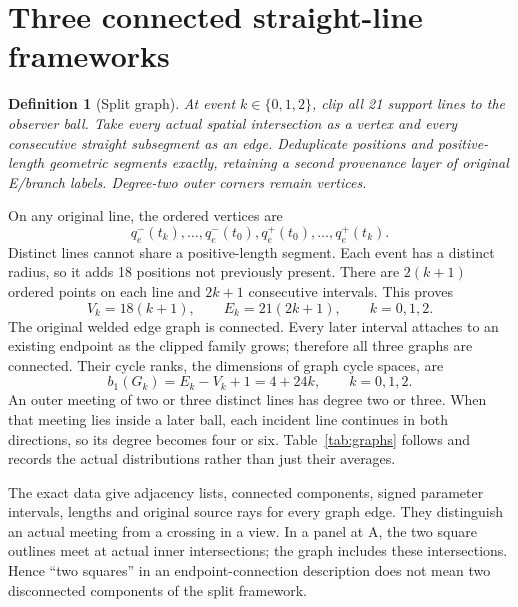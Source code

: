 \documentclass[11pt,a4paper]{article}
\newtheorem{definition}[theorem]{Definition}
\begin{document}
\section{Three connected straight-line frameworks}\label{sec:graphs}
\begin{definition}[Split graph]
At event $k\in\{0,1,2\}$, clip all 21 support lines to the observer ball. Take every actual spatial intersection as a vertex and every consecutive straight subsegment as an edge. Deduplicate positions and positive-length geometric segments exactly, retaining a second provenance layer of original E/branch labels. Degree-two outer corners remain vertices.
\end{definition}
On any original line, the ordered vertices are
\begin{equation}\label{eq:lineorder}
q_e^-(t_k),\ldots,q_e^-(t_0),q_e^+(t_0),\ldots,q_e^+(t_k).
\end{equation}
Distinct lines cannot share a positive-length segment. Each event has a distinct radius, so it adds 18 positions not previously present. There are $2(k+1)$ ordered points on each line and $2k+1$ consecutive intervals. This proves
\begin{equation}\label{eq:graphcounts}
V_k=18(k+1),\qquad E_k=21(2k+1),\qquad k=0,1,2.
\end{equation}
The original welded edge graph is connected. Every later interval attaches to an existing endpoint as the clipped family grows; therefore all three graphs are connected. Their cycle ranks, the dimensions of graph cycle spaces, are
\begin{equation}\label{eq:cycles}
b_1(G_k)=E_k-V_k+1=4+24k,\qquad k=0,1,2.
\end{equation}
An outer meeting of two or three distinct lines has degree two or three. When that meeting lies inside a later ball, each incident line continues in both directions, so its degree becomes four or six. Table~\ref{tab:graphs} follows and records the actual distributions rather than just their averages.
\begin{table}[ht]\centering\caption{Accepted connected graph inventories.}\label{tab:graphs}

\end{table}
The exact data give adjacency lists, connected components, signed parameter intervals, lengths and original source rays for every graph edge. They distinguish an actual meeting from a crossing in a view. In a panel at A, the two square outlines meet at actual inner intersections; the graph includes these intersections. Hence ``two squares'' in an endpoint-connection description does not mean two disconnected components of the split framework.
\end{document}
